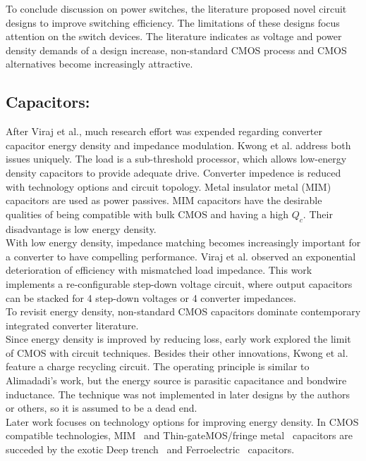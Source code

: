\documentclass[letterpaper,twocolumn,10pt]{article}
\begin{document}
\indent To conclude discussion on power switches, the literature proposed novel circuit designs to improve switching efficiency. The limitations of these designs focus attention on the switch devices. The literature indicates as voltage and power density demands of a design increase, non-standard CMOS process and CMOS alternatives become increasingly attractive.\\
\subsection{Capacitors: }After Viraj et al.\cite{Viraj2007}, much research effort was expended regarding converter capacitor energy density and impedance modulation. Kwong et al.\cite{Kwong2009} address both issues uniquely. The load is a sub-threshold processor, which allows low-energy density capacitors to provide adequate drive. Converter impedence is reduced with technology options and circuit topology. Metal insulator metal (MIM) capacitors are used as power passives. MIM capacitors have the desirable qualities of being compatible with bulk CMOS and having a high $Q_c$. Their disadvantage is low energy density.\\
With low energy density, impedance matching becomes increasingly important for a converter to have compelling performance. Viraj et al.\cite{Viraj2007} observed an exponential deterioration of efficiency with mismatched load impedance. This work implements a re-configurable step-down voltage circuit, where output capacitors can be stacked for 4 step-down voltages or 4 converter impedances.\\
\indent To revisit energy density, non-standard CMOS capacitors dominate contemporary integrated converter literature.\\
Since energy density is improved by reducing loss, early work explored the limit of CMOS with circuit techniques. Besides their other innovations, Kwong et al.\cite{Kwong2009} feature a charge recycling circuit. The operating principle is similar to Alimadadi's work\cite{Alimadadi2008}, but the energy source is parasitic capacitance and bondwire inductance. The technique was not implemented in later designs by the authors or others, so it is assumed to be a dead end.\\
\indent Later work focuses on technology options for improving energy density. In CMOS compatible technologies, MIM~\cite{Kwong2009} and Thin-gateMOS/fringe metal~\cite{Pique2012} capacitors are succeded by the exotic Deep trench~\cite{Pique} and Ferroelectric~\cite{Damak2013} capacitors.\\
\end{document}
